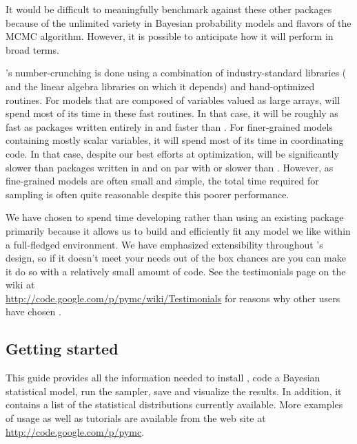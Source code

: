 \documentclass[]{jss}
\begin{document}
It would be difficult to meaningfully benchmark  against these other packages because of the unlimited variety in Bayesian probability models and flavors of the MCMC algorithm. However, it is possible to anticipate how it will perform in broad terms.

's number-crunching is done using a combination of industry-standard libraries ( \citep{numpy}  and the linear algebra libraries on which it depends) and hand-optimized  routines. For models that are composed of variables valued as large arrays,  will spend most of its time in these fast routines. In that case, it will be roughly as fast as packages written entirely in  and faster than . For finer-grained models containing mostly scalar variables, it will spend most of its time in coordinating  code. In that case, despite our best efforts at optimization,  will be significantly slower than packages written in  and on par with or slower than . However, as fine-grained models are often small and simple, the total time required for sampling is often quite reasonable despite this poorer performance.

We have chosen to spend time developing  rather than using an existing package primarily because it allows us to build and efficiently fit any model we like within a full-fledged  environment. We have emphasized extensibility throughout 's design, so if it doesn't meet your needs out of the box chances are you can make it do so with a relatively small amount of code. See the testimonials page on the wiki at \\
\href{http://code.google.com/p/pymc/wiki/Testimonials}{http://code.google.com/p/pymc/wiki/Testimonials} for reasons why other users have chosen .



\subsection{Getting started}
  \label{getting-started}%


This guide provides all the information needed to install , code
a Bayesian statistical model, run the sampler, save and visualize the results.
In addition, it contains a list of the statistical distributions currently available. More examples of usage as well as
tutorials are available from the  web site at \href{http://code.google.com/p/pymc}{http://code.google.com/p/pymc}.
\end{document}
